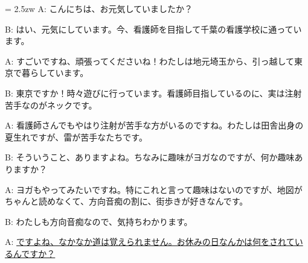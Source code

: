 \documentclass[11pt]{amsart}
\title{}
\author{}
\newenvironment{hangall}[1]{\hangindent = 2.5zw\everypar{\hangindent = 2.5zw}}{}
\begin{document}
\maketitle
\begin{hangall}{}%
A: こんにちは、お元気していましたか？

B: はい、元気にしています。今、看護師を目指して千葉の看護学校に通っています。

A: すごいですね、頑張ってくださいね！わたしは地元埼玉から、引っ越して東京で暮らしています。

B: 東京ですか！時々遊びに行っています。看護師目指しているのに、実は注射苦手なのがネックです。

A: 看護師さんでもやはり注射が苦手な方がいるのですね。わたしは田舎出身の夏生れですが、雷が苦手なたちです。

B: そういうこと、ありますよね。ちなみに趣味がヨガなのですが、何か趣味ありますか？

A: ヨガもやってみたいですね。特にこれと言って趣味はないのですが、地図がちゃんと読めなくて、方向音痴の割に、街歩きが好きなんです。

B: わたしも方向音痴なので、気持ちわかります。

A: \ul{ですよね、なかなか道は覚えられません。お休みの日なんかは何をされているんですか？}\end{hangall}
\end{document}
